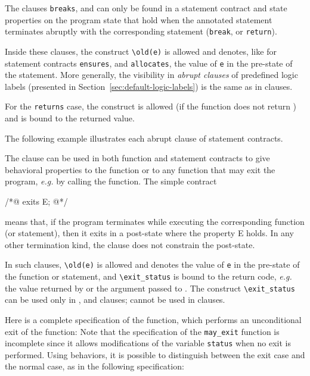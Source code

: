 The clauses \lstinline|breaks|, \continues{} 
and \returns{}
can only be found in a statement contract and
state properties on the program state that hold when the
annotated statement terminates abruptly with the corresponding
statement (\lstinline|break|, \Continue{} or \lstinline|return|).

Inside these clauses, the construct \lstinline|\old(e)|
is allowed and denotes, like for statement contracts
\lstinline|ensures|, \assigns and \lstinline|allocates|, the value of
\lstinline|e| in the pre-state of the statement.
 More generally, the visibility in \textsl{abrupt clauses} of predefined 
logic labels
 (presented in Section~\ref{sec:default-logic-labels}) is the 
same as in \ensures{} clauses.

For the \lstinline|returns| case, the \result{}
construct is allowed (if the function does not return \void) and is bound
to the returned value.

\begin{example}
  The following example illustrates each abrupt
  clause of statement contracts.
\end{example}

The \exits{} clause can be used in both function and statement
contracts to give behavioral properties to the \main{} function
or to any function that may exit the program,
\emph{e.g.} by calling the \exit{} function.
The simple contract
\begin{listing-nonumber}
/*@ exits E;
  @*/
\end{listing-nonumber}
means that, if the program terminates while executing the corresponding
function (or statement), then it exits in a post-state where the property
E holds.
In any other termination kind, the \exits{} clause does not constrain
the post-state.

In such clauses, \lstinline|\old(e)|
is allowed and denotes the value of \lstinline|e| in the pre-state of
the function or statement,
and \lstinline|\exit_status| is bound to the return code,
\emph{e.g.} the value returned by \main{} or the argument passed to \exit{}.
The  construct \lstinline|\exit_status|
can be used only in \exits{},
 \assigns{} and \allocates{} clauses;
\result cannot be used in \exits{} clauses.

\begin{example}
\label{ex:assigns-and-abrupt-termination}
  Here is a complete specification of the \exit{} function, which
  performs an unconditional exit of the \main{} function:
  Note that the specification of the \lstinline|may_exit|
  function is incomplete since it allows modifications of the variable
  \lstinline|status| when no exit is performed.
  Using behaviors, it is possible to distinguish between the exit case
  and the normal case, as in the following specification:
\end{example}

